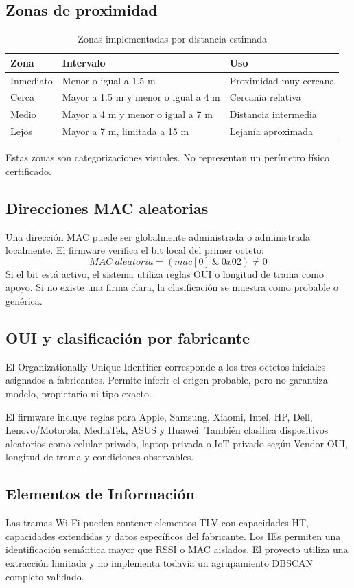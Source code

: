 \documentclass[12pt,a4paper]{article}
\begin{document}
\subsection{Zonas de proximidad}
\begin{table}[htbp]
\centering
\caption{Zonas implementadas por distancia estimada}
\begin{tabular}{lll}
\toprule
Zona & Intervalo & Uso \\
\midrule
Inmediato & Menor o igual a 1.5 m & Proximidad muy cercana \\
Cerca & Mayor a 1.5 m y menor o igual a 4 m & Cercanía relativa \\
Medio & Mayor a 4 m y menor o igual a 7 m & Distancia intermedia \\
Lejos & Mayor a 7 m, limitada a 15 m & Lejanía aproximada \\
\bottomrule
\end{tabular}
\end{table}
Estas zonas son categorizaciones visuales. No representan un perímetro físico certificado.

\subsection{Direcciones MAC aleatorias}
Una dirección MAC puede ser globalmente administrada o administrada localmente. El firmware verifica el bit local del primer octeto:
\[
MAC\ aleatoria=(mac[0]\ \&\ 0x02)\neq 0
\]
Si el bit está activo, el sistema utiliza reglas OUI o longitud de trama como apoyo. Si no existe una firma clara, la clasificación se muestra como probable o genérica.

\subsection{OUI y clasificación por fabricante}
El Organizationally Unique Identifier corresponde a los tres octetos iniciales asignados a fabricantes. Permite inferir el origen probable, pero no garantiza modelo, propietario ni tipo exacto.

El firmware incluye reglas para Apple, Samsung, Xiaomi, Intel, HP, Dell, Lenovo/Motorola, MediaTek, ASUS y Huawei. También clasifica dispositivos aleatorios como celular privado, laptop privada o IoT privado según Vendor OUI, longitud de trama y condiciones observables.

\subsection{Elementos de Información}
Las tramas Wi-Fi pueden contener elementos TLV con capacidades HT, capacidades extendidas y datos específicos del fabricante. Los IEs permiten una identificación semántica mayor que RSSI o MAC aislados. El proyecto utiliza una extracción limitada y no implementa todavía un agrupamiento DBSCAN completo validado.
\end{document}
